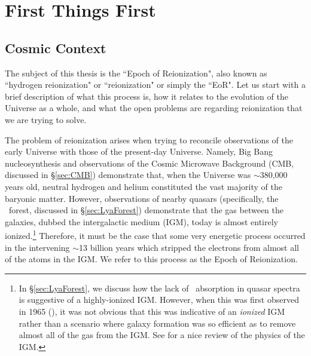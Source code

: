 


\ifpdf
    \graphicspath{{introduction/figures/PNG/}{introduction/figures/PDF/}{introduction/figures/}}
\else
    \graphicspath{{introduction/figures/EPS/}{introduction/figures/}}
\fi

\chapter{First Things First}
\section{Cosmic Context}\label{sec:CosmicContext}

The subject of this thesis is the ``Epoch of Reionization", also known as ``hydrogen reionization" or ``reionization" or simply the ``EoR". Let us start with a brief description of what this process is, how it relates to the evolution of the Universe as a whole, and what the open problems are regarding reionization that we are trying to solve. 


The problem of reionization arises when trying to reconcile observations of the early Universe with those of the present-day Universe. Namely, Big Bang nucleosynthesis and observations of the Cosmic Microwave Background (CMB, discussed in \S \ref{sec:CMB}) demonstrate that, when the Universe was $\sim$380,000 years old, neutral hydrogen and helium constituted the vast majority of the baryonic matter. However, observations of nearby quasars (specifically, the \lya\ forest, discussed in \S \ref{sec:LyaForest}) demonstrate that the gas between the galaxies, dubbed the intergalactic medium (IGM), today is almost entirely ionized.\footnote{In \S \ref{sec:LyaForest}, we discuss how the lack of \lya\ absorption in quasar spectra is suggestive of a highly-ionized IGM. However, when this was first observed in 1965 (\citealt{1965ApJ...142.1633G}), it was not obvious that this was indicative of an \textit{ionized} IGM rather than a scenario where galaxy formation was so efficient as to remove almost all of the gas from the IGM. See \cite{meiksin2009physics} for a nice review of the physics of the IGM.} Therefore, it must be the case that some very energetic process occurred in the intervening $\sim$13 billion years which stripped the electrons from almost all of the atoms in the IGM. We refer to this process as the Epoch of Reionization.


